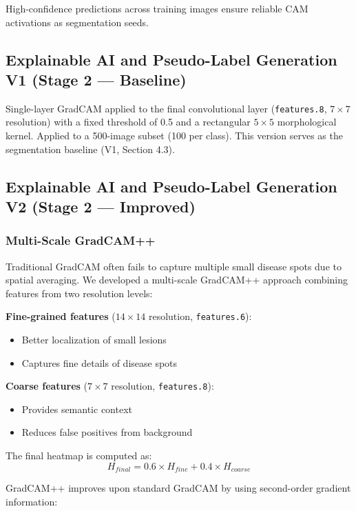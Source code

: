 \documentclass[10pt,a4paper]{article}
\begin{document}
High-confidence predictions across training images ensure reliable CAM activations as segmentation seeds.

\subsection{Explainable AI and Pseudo-Label Generation V1 (Stage 2 --- Baseline)}

Single-layer GradCAM applied to the final convolutional layer (\texttt{features.8}, $7\times7$ resolution) with a fixed threshold of 0.5 and a rectangular $5\times5$ morphological kernel. Applied to a 500-image subset (100 per class). This version serves as the segmentation baseline (V1, Section 4.3).

\subsection{Explainable AI and Pseudo-Label Generation V2 (Stage 2 --- Improved)}

\subsubsection{Multi-Scale GradCAM++}

Traditional GradCAM often fails to capture multiple small disease spots due to spatial averaging. We developed a multi-scale GradCAM++ approach combining features from two resolution levels:

\textbf{Fine-grained features} ($14 \times 14$ resolution, \texttt{features.6}):
\begin{itemize}
\item Better localization of small lesions
\item Captures fine details of disease spots
\end{itemize}

\textbf{Coarse features} ($7 \times 7$ resolution, \texttt{features.8}):
\begin{itemize}
\item Provides semantic context
\item Reduces false positives from background
\end{itemize}

The final heatmap is computed as:
\begin{equation}
H_{final} = 0.6 \times H_{fine} + 0.4 \times H_{coarse}
\end{equation}

GradCAM++ improves upon standard GradCAM by using second-order gradient information:
\end{document}
